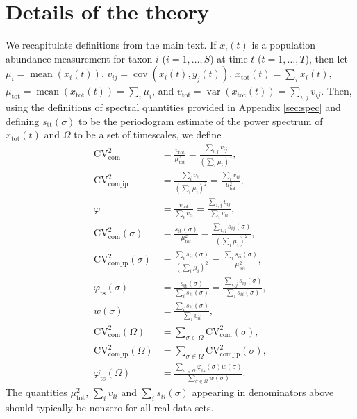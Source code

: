 \documentclass[letterpaper,11pt]{article}
\newcommand{\var}{{\operatorname{var}}}
\newcommand{\cov}{{\operatorname{cov}}}
\newcommand{\mean}{{\operatorname{mean}}}
\begin{document}
\section{Details of the theory}
\noindent We recapitulate definitions from the main text. If $x_i(t)$ is a population abundance measurement for taxon $i$ 
($i=1,\ldots,S$) at time $t$ ($t=1,\ldots,T$), then let 
$\mu_i=\mean(x_i (t))$, $v_{ij}=\cov(x_i (t),y_j (t))$, $x_{\text{tot}} (t)=\sum_i x_i(t)$, 
$\mu_{\text{tot}}=\mean(x_{\text{tot}}(t))=\sum_i \mu_i$, and 
$v_{\text{tot}}=\var(x_{\text{tot}}(t))=\sum_{i,j}v_{ij}$. Then, 
using the definitions of spectral quantities provided in Appendix \ref{sec:spec} and 
defining $s_{\text{tt}}(\sigma)$ to be the periodogram estimate of the 
power spectrum of $x_{\text{tot}}(t)$ and $\Omega$ to be a set of timescales, we define
\begin{align}
\text{CV}_{\text{com}}^2 &= \frac{v_{\text{tot}}}{\mu_{\text{tot}}^2}=\frac{\sum_{i,j}v_{ij}}{(\sum_i \mu_i)^2},\\
\text{CV}_{\text{com\_ip}}^2 &=\frac{\sum_{i}v_{ii}}{(\sum_i \mu_i)^2}
=\frac{\sum_{i}v_{ii}}{\mu_{\text{tot}}^2},\\
\varphi &= \frac{v_{\text{tot}}}{\sum_i v_{ii}}
=\frac{\sum_{i,j}v_{ij}}{\sum_i v_{ii}}, \\
\text{CV}_{\text{com}}^2(\sigma) &= \frac{s_{\text{tt}}(\sigma)}{\mu_{\text{tot}}^2}
=\frac{\sum_{i,j} s_{ij}(\sigma)}{(\sum_i \mu_{i})^2},\\
\text{CV}_{\text{com\_ip}}^2(\sigma) &= \frac{\sum_i s_{ii}(\sigma)}{(\sum_i \mu_{i})^2}
=\frac{\sum_{i}s_{ii}(\sigma)}{\mu_{\text{tot}}^2},\\
\varphi_{\text{ts}}(\sigma) &= \frac{s_{\text{tt}}(\sigma)}{\sum_i s_{ii}(\sigma)}
=\frac{\sum_{i,j}s_{ij}(\sigma)}{\sum_i s_{ii}(\sigma)},\\
w(\sigma) &= \frac{\sum_i s_{ii}(\sigma)}{\sum_i v_{ii}},\\
\text{CV}_{\text{com}}^2(\Omega) &= \sum_{\sigma \in \Omega} \text{CV}_{\text{com}}^2(\sigma),\\
\text{CV}_{\text{com\_ip}}^2(\Omega) &= \sum_{\sigma \in \Omega} \text{CV}_{\text{com\_ip}}^2(\sigma),\\
\overline{\varphi_{\text{ts}}}(\Omega) &= \frac{\sum_{\sigma \in \Omega} \varphi_{\text{ts}}(\sigma) w(\sigma)}
{\sum_{\sigma \in \Omega} w(\sigma)}.
\end{align}
The quantities $\mu_{\text{tot}}^2$, $\sum_i v_{ii}$ and 
$\sum_i s_{ii}(\sigma)$ appearing in denominators above 
should typically be nonzero for all real data sets. 
\end{document}
